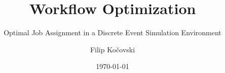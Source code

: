 \documentclass{seal_thesis}
\date{\today}
\title{Workflow Optimization}
\subtitle{Optimal Job Assignment in a Discrete Event Simulation Environment}
\author{Filip Ko\v{c}ovski}
\begin{document}
\maketitle

\frontmatter



\glsresetall



\glsresetall



\tableofcontents

\listoffigures

\listoftables

\mainmatter

\glsresetall



\glsresetall



\glsresetall



\glsresetall



\glsresetall



\glsresetall



\glsresetall



\glsresetall



\appendix

\glsresetall



\glsresetall



\glsresetall



\glsresetall



\backmatter




\printglossaries
\end{document}
